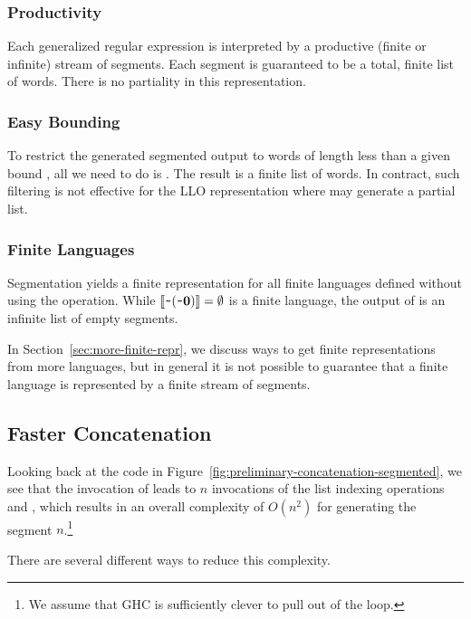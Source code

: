\subsubsection{Productivity}
Each generalized regular expression is interpreted by a productive
(finite or infinite) stream of segments. Each segment is guaranteed to
be a total, finite list of words. There is no partiality in this representation.

\subsubsection{Easy Bounding}
To restrict the generated segmented output  to words of length less than a given
bound , all we need to do is . The result is
a finite list of words. In contract, such filtering is not effective
for the LLO representation where  may generate a partial list.

\subsubsection{Finite Languages}
Segmentation yields a finite representation for all finite languages
defined without using the  operation. While
$\llbracket\texttt{\textasciitilde}{(\texttt{\textasciitilde}{\mathbf0})}\rrbracket = \emptyset$ is a finite 
language, the output of  is an
infinite list of empty segments.

In Section~\ref{sec:more-finite-repr}, we discuss ways to get finite
representations from more languages, but in general it is
not possible to guarantee that a finite language is represented by a
finite stream of segments.

\subsection{Faster Concatenation}
\label{sec:faster-concatenation}

Looking back at the code in
Figure~\ref{fig:preliminary-concatenation-segmented}, we see that the
invocation of  leads to $n$ invocations of the list
indexing operations  and , which
results in an  overall complexity of $O (n^2)$ for generating the
segment $n$.\footnote{We assume that
GHC is sufficiently clever to pull  out of the loop.}

There are several different ways to reduce this complexity.

